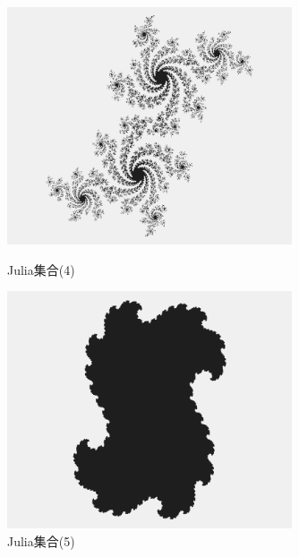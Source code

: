 \documentclass[dvipdfmx]{jsarticle}
\theoremstyle{definition}
\begin{document}
\begin{figure}[H]
    \begin{minipage}{0.49\hsize}
        \centering
        \includegraphics[width=0.75\textwidth]{figure/others/set/julia_set4.png}
        \caption{Julia集合(4)}
    \end{minipage}
    \begin{minipage}{0.49\hsize}
        \centering
        \includegraphics[width=0.75\textwidth]{figure/others/set/julia_set5.png}
        \caption{Julia集合(5)}
    \end{minipage}
\end{figure}
\end{document}

